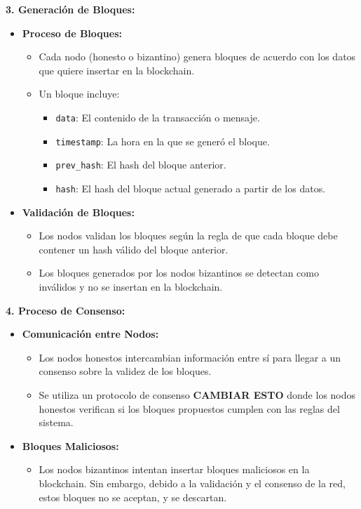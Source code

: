 {{    \textbf{3. Generación de Bloques:}
    \begin{itemize}
        \item \textbf{Proceso de Bloques:}
        \begin{itemize}
            \item Cada nodo (honesto o bizantino) genera bloques de acuerdo con los datos que quiere insertar en la blockchain.
            \item Un bloque incluye:
            \begin{itemize}
                \item \texttt{data}: El contenido de la transacción o mensaje.
                \item \texttt{timestamp}: La hora en la que se generó el bloque.
                \item \texttt{prev\_hash}: El hash del bloque anterior.
                \item \texttt{hash}: El hash del bloque actual generado a partir de los datos.
            \end{itemize}
        \end{itemize}
        \item \textbf{Validación de Bloques:}
        \begin{itemize}
            \item Los nodos validan los bloques según la regla de que cada bloque debe contener un hash válido del bloque anterior.
            \item Los bloques generados por los nodos bizantinos se detectan como inválidos y no se insertan en la blockchain.
        \end{itemize}
    \end{itemize}

    \vspace{0.5cm}

    \textbf{4. Proceso de Consenso:}
    \begin{itemize}
        \item \textbf{Comunicación entre Nodos:}
        \begin{itemize}
            \item Los nodos honestos intercambian información entre sí para llegar a un consenso sobre la validez de los bloques.
            \item Se utiliza un protocolo de consenso \textbf{CAMBIAR ESTO} donde los nodos honestos verifican si los bloques propuestos cumplen con las reglas del sistema.
        \end{itemize}
        \item \textbf{Bloques Maliciosos:}
        \begin{itemize}
            \item Los nodos bizantinos intentan insertar bloques maliciosos en la blockchain. Sin embargo, debido a la validación y el consenso de la red, estos bloques no se aceptan, y se descartan.
        \end{itemize}
    \end{itemize}

}}
